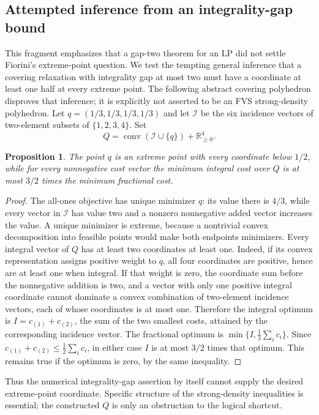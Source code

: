 \documentclass[11pt]{article}
\newtheorem{proposition}{Proposition}
\begin{document}
\subsection{Attempted inference from an integrality-gap bound}
This fragment emphasizes that a gap-two theorem for an LP did not settle Fiorini's extreme-point question. We test the tempting general inference that a covering relaxation with integrality gap at most two must have a coordinate at least one half at every extreme point. The following abstract covering polyhedron disproves that inference; it is explicitly not asserted to be an FVS strong-density polyhedron.
Let $q=(1/3,1/3,1/3,1/3)$ and let $\mathcal I$ be the six incidence vectors of two-element subsets of $\{1,2,3,4\}$. Set
\[
 Q=\operatorname{conv}(\mathcal I\cup\{q\})+\mathbb R_{\ge0}^4.
\]
\begin{proposition}
The point $q$ is an extreme point with every coordinate below $1/2$, while for every nonnegative cost vector the minimum integral cost over $Q$ is at most $3/2$ times the minimum fractional cost.
\end{proposition}
\begin{proof}
The all-ones objective has unique minimizer $q$: its value there is $4/3$, while every vector in $\mathcal I$ has value two and a nonzero nonnegative added vector increases the value. A unique minimizer is extreme, because a nontrivial convex decomposition into feasible points would make both endpoints minimizers.
Every integral vector of $Q$ has at least two coordinates at least one. Indeed, if its convex representation assigns positive weight to $q$, all four coordinates are positive, hence are at least one when integral. If that weight is zero, the coordinate sum before the nonnegative addition is two, and a vector with only one positive integral coordinate cannot dominate a convex combination of two-element incidence vectors, each of whose coordinates is at most one. Therefore the integral optimum is $I=c_{(1)}+c_{(2)}$, the sum of the two smallest costs, attained by the corresponding incidence vector.
The fractional optimum is $\min\{I,\tfrac13\sum_i c_i\}$. Since $c_{(1)}+c_{(2)}\le\tfrac12\sum_i c_i$, in either case $I$ is at most $3/2$ times that optimum. This remains true if the optimum is zero, by the same inequality.
\end{proof}
Thus the numerical integrality-gap assertion by itself cannot supply the desired extreme-point coordinate. Specific structure of the strong-density inequalities is essential; the constructed $Q$ is only an obstruction to the logical shortcut.
\end{document}
